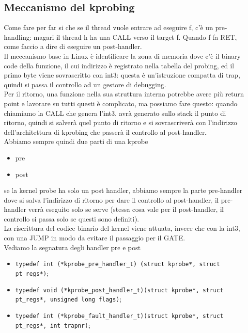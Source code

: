\documentclass[12pt, oneside]{extbook}
\begin{document}
\subsection{Meccanismo del kprobing}
Come fare per far si che se il thread vuole entrare ad eseguire f, c'è un pre-handling: magari il thread h ha una CALL verso il target f. Quando f fa RET, come faccio a dire di eseguire un post-handler.\\Il meccanismo base in Linux è identificare la zona di memoria dove c'è il binary code della funzione, il cui indirizzo è registrato nella tabella del probing, ed il primo byte viene sovrascritto con int3: questa è un'istruzione compatta di trap, quindi si passa il controllo ad un gestore di debugging.\\Per il ritorno, una funzione nella sua struttura interna potrebbe avere più return point e lavorare su tutti questi è complicato, ma possiamo fare questo: quando chiamiamo la CALL che genera l'int3, avrà generato sullo stack il punto di ritorno, quindi si salverà quel punto di ritorno e si sovrascriverà con l'indirizzo dell'architettura di kprobing che passerà il controllo al post-handler.\\Abbiamo sempre quindi due parti di una kprobe
\begin{itemize}
\item pre
\item post
\end{itemize}
se la kernel probe ha solo un post handler, abbiamo sempre la parte pre-handler dove si salva l'indirizzo di ritorno per dare il controllo al post-handler, il pre-handler verrà eseguito solo se serve (stessa cosa vale per il post-handler, il controllo si passa solo se questi sono definiti).\\La riscrittura del codice binario del kernel viene attuata, invece che con la int3, con una JUMP in modo da evitare il passaggio per il GATE.\\Vediamo la segnatura degli handler pre e post
\begin{itemize}
	\item \texttt{typedef int (*kprobe\_pre\_handler\_t) (struct kprobe*, struct pt\_regs*)};
	\item \texttt{typedef void (*kprobe\_post\_handler\_t)(struct kprobe*, struct pt\_regs*, unsigned long flags)};
	\item \texttt{typedef int (*kprobe\_fault\_handler\_t)(struct kprobe*, struct pt\_regs*, int trapnr)};
\end{itemize}
\end{document}

